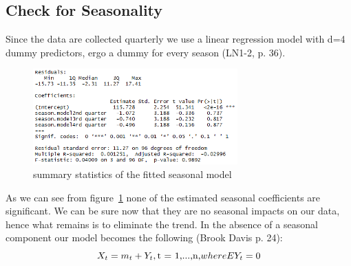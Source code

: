 \documentclass[11pt,a4paper]{article}
\begin{document}
\subsection{Check for Seasonality}
Since the data are collected quarterly we use a linear regression model with d=4 dummy predictors, ergo a dummy for every season (LN1-2, p. 36). 
\begin{figure}[!htb]
\centering
\includegraphics[angle=0,
width=0.7\textwidth]{summary_seasonmodel}
\caption{summary statistics of the fitted seasonal model\label{fig:summary_seasonmodel}}
\end{figure}
As we can see from figure~\ref{fig:summary_seasonmodel} none of the estimated seasonal coefficients are significant. We can be sure now that they are no seasonal impacts on our data, hence what remains is to eliminate the trend. In the absence of a seasonal component our model becomes the following (Brook Davis p. 24):
\begin{equation}
X_t = m_t + Y_t, \text{t = 1,...,n,} 
\\where EY_t = 0
\end{equation} 
\end{document}
